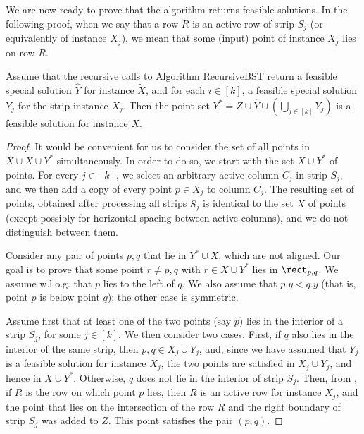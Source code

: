 \documentclass{toc}
\begin{document}
We are now ready to prove that the algorithm returns feasible solutions.
In the following proof, when we say that a row $R$ is an active row of strip $S_j$ (or equivalently of instance $X_j$), we mean that some (input) point of instance $X_j$ lies on row $R$.


\begin{theorem} \label{thm: algorithm feasibility}
	Assume that the recursive calls to Algorithm {\sc RecursiveBST} return a feasible special solution $\hat Y$ for instance $\widetilde{X}$, and for each $i\in [k]$, a feasible special solution $Y_j$ for the strip instance $X_j$. Then the point set $Y^*=Z \cup \hat{Y} \cup (\bigcup_{j \in [k]} Y_j)$ is a feasible solution for instance $X$. 
\end{theorem}

\begin{proof}
	It would be convenient for us to consider the set of all points in  $\widetilde{X}\cup X\cup Y^*$ simultaneously. 
	In order to do so, we start with the set $X\cup Y^*$ of points. For every $j \in [k]$, we select an arbitrary active column $C_j$ in strip $S_j$, and we then add a copy of every point $p\in X_j$ to column $C_j$. The resulting set of points, obtained after processing all strips $S_j$ is identical to the set $\widetilde{X}$ of points (except possibly for horizontal spacing between active columns), and we do not distinguish between them.  
	
	
	Consider any pair of points $p,q$ that lie in $Y^*\cup X$, which are not aligned. Our goal is to prove that some point $r\neq p,q$ with $r\in X\cup Y^*$ lies in $\rect_{p,q}$. We assume w.l.o.g. that $p$ lies to the left of $q$. We also assume that $p.y<q.y$ (that is, point $p$ is below point $q$); the other case is symmetric.
	
	Assume first that at least one of the two points (say $p$) lies in the interior of a strip $S_j$, for some $j \in [k]$. We then consider two cases. First, if $q$ also lies in the interior of the same strip, then $p,q\in X_j \cup Y_j$, and, since we have assumed that $Y_j$ is a feasible solution for instance $X_j$, the two points are satisfied in $X_j\cup Y_j$, and hence in $X\cup Y^*$. Otherwise, $q$ does not lie in the interior of strip $S_j$. Then, from , if $R$ is the row on which point $p$ lies, then $R$ is an active row for instance $X_j$, and the point that lies on the intersection of the row $R$ and the right boundary of strip $S_j$ was added to $Z$. This point satisfies the pair $(p,q)$.


\end{proof}
\end{document}
